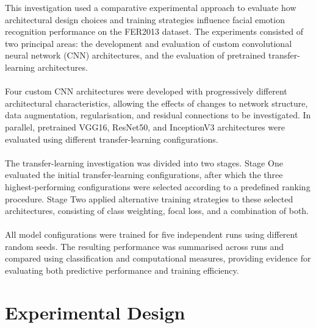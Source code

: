 \documentclass[12pt, a4paper]{report}
\let\oldsection\section
\renewcommand{\section}{%
    \Needspace{6\baselineskip}%
    \oldsection
}
\begin{document}
		This investigation used a comparative experimental approach to evaluate how architectural design choices and training strategies influence facial emotion recognition performance on the FER2013 dataset. The experiments consisted of two principal areas: the development and evaluation of custom convolutional neural network (CNN) architectures, and the evaluation of pretrained transfer-learning architectures.\\\\
		Four custom CNN architectures were developed with progressively different architectural characteristics, allowing the effects of changes to network structure, data augmentation, regularisation, and residual connections to be investigated. In parallel, pretrained VGG16, ResNet50, and InceptionV3 architectures were evaluated using different transfer-learning configurations.\\\\
		The transfer-learning investigation was divided into two stages. Stage One evaluated the initial transfer-learning configurations, after which the three highest-performing configurations were selected according to a predefined ranking procedure. Stage Two applied alternative training strategies to these selected architectures, consisting of class weighting, focal loss, and a combination of both.\\\\
		All model configurations were trained for five independent runs using different random seeds. The resulting performance was summarised across runs and compared using classification and computational measures, providing evidence for evaluating both predictive performance and training efficiency.
		
		\newpage
		\section{Experimental Design}
		\label{sec:Experimental_Design}
			
\end{document}
